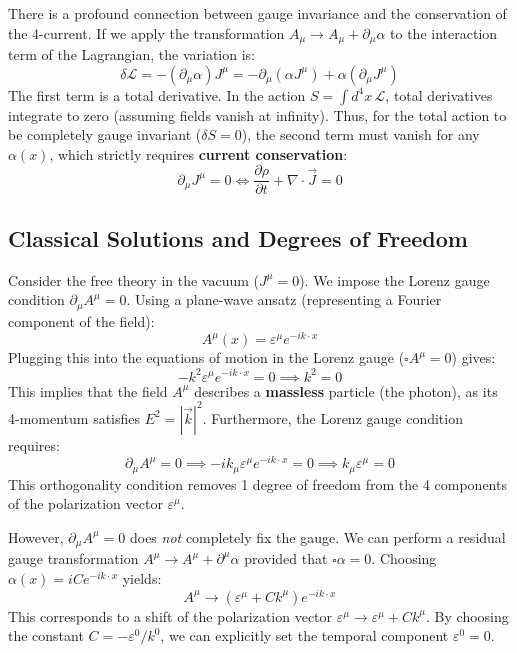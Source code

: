 \begin{remark}
    There is a profound connection between gauge invariance and the conservation of the 4-current. If we apply the transformation \(A_\mu \to A_\mu + \partial_\mu \alpha\) to the interaction term of the Lagrangian, the variation is:
    \[
        \delta \mathcal{L} = -(\partial_\mu \alpha) J^\mu = -\partial_\mu (\alpha J^\mu) + \alpha (\partial_\mu J^\mu)
    \]
    The first term is a total derivative. In the action \(S = \int d^4x \, \mathcal{L}\), total derivatives integrate to zero (assuming fields vanish at infinity). Thus, for the total action to be completely gauge invariant (\(\delta S = 0\)), the second term must vanish for any \(\alpha(x)\), which strictly requires \textbf{current conservation}:
    \[
        \partial_\mu J^\mu = 0 \iff \frac{\partial \rho}{\partial t} + \nabla \cdot \vec{J} = 0
    \]
\end{remark}

\subsection{Classical Solutions and Degrees of Freedom}

Consider the free theory in the vacuum (\(J^\mu = 0\)). We impose the Lorenz gauge condition \(\partial_\mu A^\mu = 0\). Using a plane-wave ansatz (representing a Fourier component of the field):
\[
    A^\mu(x) = \varepsilon^\mu e^{-i k \cdot x}
\]
Plugging this into the equations of motion in the Lorenz gauge (\(\square A^\mu = 0\)) gives:
\[
    -k^2 \varepsilon^\mu e^{-i k \cdot x} = 0 \implies k^2 = 0
\]
This implies that the field \(A^\mu\) describes a \textbf{massless} particle (the photon), as its 4-momentum satisfies \(E^2 = |\vec{k}|^2\).
Furthermore, the Lorenz gauge condition requires:
\[
    \partial_\mu A^\mu = 0 \implies -i k_\mu \varepsilon^\mu e^{-i k \cdot x} = 0 \implies k_\mu \varepsilon^\mu = 0
\]
This orthogonality condition removes 1 degree of freedom from the 4 components of the polarization vector \(\varepsilon^\mu\).

However, \(\partial_\mu A^\mu = 0\) does \textit{not} completely fix the gauge. We can perform a residual gauge transformation \(A^\mu \to A^\mu + \partial^\mu \alpha\) provided that \(\square \alpha = 0\). Choosing \(\alpha(x) = i C e^{-i k \cdot x}\) yields:
\[
    A^\mu \to (\varepsilon^\mu + C k^\mu) e^{-i k \cdot x}
\]
This corresponds to a shift of the polarization vector \(\varepsilon^\mu \to \varepsilon^\mu + C k^\mu\). By choosing the constant \(C = -\varepsilon^0 / k^0\), we can explicitly set the temporal component \(\varepsilon^0 = 0\).

